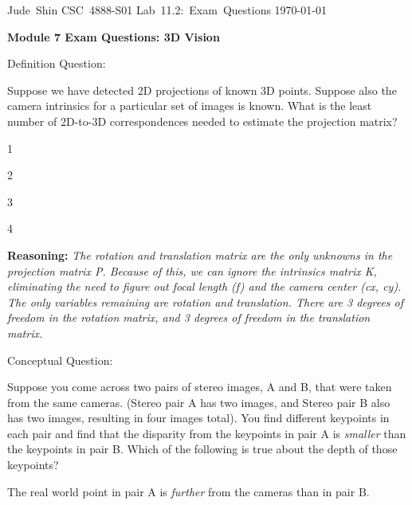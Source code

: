 \documentclass[11pt]{article}
\begin{document}
\hfill\vbox{\hbox{Jude Shin}
		\hbox{CSC 4888-S01}	
		\hbox{Lab 11.2: Exam Questions}	
		\hbox{\today}}\par

\bigskip
\centerline{\Large\bf Module 7 Exam Questions: 3D Vision}\par
\bigskip

\begin{enumerate}

	{\bf \item Definition Question:}

		Suppose we have detected 2D projections of known 3D points.
		Suppose also the camera intrinsics for a particular set of images is known.
		What is the least number of 2D-to-3D correspondences needed to estimate the projection matrix?

		\begin{enumerate}

			\item 1

			\item 2

			{\bf \item 3}

			\item 4

		\end{enumerate}

		{\bf Reasoning:} {\it The rotation and translation matrix are the only unknowns in the projection matrix P. Because of this, we can ignore the intrinsics matrix K, eliminating the need to figure out focal length (f) and the camera center (cx, cy). The only variables remaining are rotation and translation. There are 3 degrees of freedom in the rotation matrix, and 3 degrees of freedom in the translation matrix.}

	{\bf \item Conceptual Question:}

		Suppose you come across two pairs of stereo images, A and B, that were taken from the same cameras.
		(Stereo pair A has two images, and Stereo pair B also has two images, resulting in four images total).
		You find different keypoints in each pair and find that the disparity from the keypoints in pair A is {\it smaller} than the keypoints in pair B. Which of the following is true about the depth of those keypoints?

		\begin{enumerate}

			{\bf \item The real world point in pair A is {\it further} from the cameras than in pair B.}


\end{enumerate}
\end{enumerate}
\end{document}
